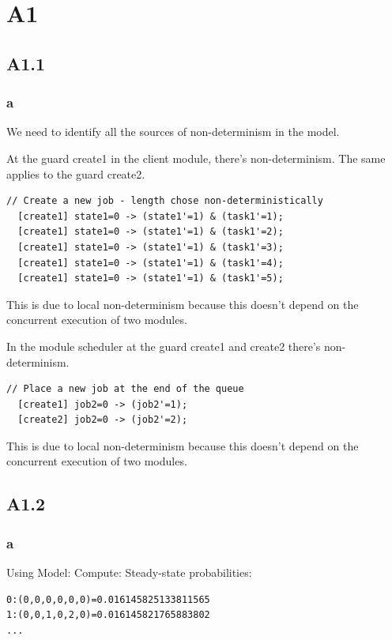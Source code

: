 
\section{A1}

\subsection{A1.1}

\subsubsection{a}

We need to identify all the sources of non-determinism in the model. 

At the guard create1 in the client module, there's non-determinism. The same applies to the guard create2.
\begin{verbatim}
// Create a new job - length chose non-deterministically
  [create1] state1=0 -> (state1'=1) & (task1'=1);
  [create1] state1=0 -> (state1'=1) & (task1'=2);
  [create1] state1=0 -> (state1'=1) & (task1'=3);
  [create1] state1=0 -> (state1'=1) & (task1'=4);
  [create1] state1=0 -> (state1'=1) & (task1'=5);
\end{verbatim}
This is due to local non-determinism because this doesn't depend on the concurrent execution of two modules.

In the module scheduler at the guard create1 and create2 there's non-determinism.
\begin{verbatim}
// Place a new job at the end of the queue
  [create1] job2=0 -> (job2'=1);
  [create2] job2=0 -> (job2'=2);
\end{verbatim}
This is due to local non-determinism because this doesn't depend on the concurrent execution of two modules.

\subsection{A1.2}

\subsubsection{a}

Using Model: Compute: Steady-state probabilities:

\begin{verbatim}
0:(0,0,0,0,0,0)=0.016145825133811565
1:(0,0,1,0,2,0)=0.016145821765883802
...
\end{verbatim}

